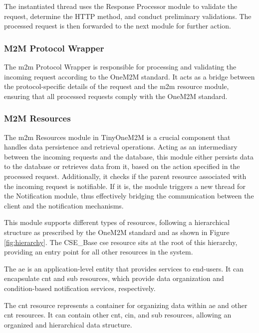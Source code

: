 \documentclass[a4paper,fleqn]{cas-dc}
\begin{document}
The instantiated thread uses the Response Processor module to validate the request, determine the HTTP method, and conduct preliminary validations. The processed request is then forwarded to the next module for further action.

\subsubsection{M2M Protocol Wrapper}

The \gls{m2m} Protocol Wrapper is responsible for processing and validating the incoming request according to the OneM2M standard. It acts as a bridge between the protocol-specific details of the request and the \gls{m2m} resource module, ensuring that all processed requests comply with the OneM2M standard.

\subsubsection{M2M Resources}\label{sec:M2MResource}

The \gls{m2m} Resources module in TinyOneM2M is a crucial component that handles data persistence and retrieval operations. Acting as an intermediary between the incoming requests and the database, this module either persists data to the database or retrieves data from it, based on the action specified in the processed request. Additionally, it checks if the parent resource associated with the incoming request is notifiable. If it is, the module triggers a new thread for the Notification module, thus effectively bridging the communication between the client and the notification mechanisms.

This module supports different types of resources, following a hierarchical structure as prescribed by the OneM2M standard and as shown in Figure \ref{fig:hierarchy}. The CSE\_Base \gls{cse} resource sits at the root of this hierarchy, providing an entry point for all other resources in the system.

The \gls{ae} is an application-level entity that provides services to end-users. It can encapsulate \gls{cnt} and \gls{sub} resources, which provide data organization and condition-based notification services, respectively.

The \gls{cnt} resource represents a container for organizing data within \gls{ae} and other \gls{cnt} resources. It can contain other \gls{cnt}, \gls{cin}, and \gls{sub} resources, allowing an organized and hierarchical data structure.
\end{document}
